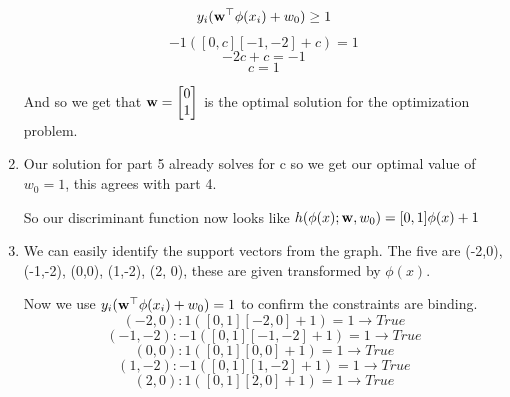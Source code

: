 \documentclass[submit]{harvardml}
\begin{document}
\begin{enumerate}
        \begin{equation*}
            y_i(\mathbf{w}^\top \mathbf{\phi}(x_i) + w_0) \geq 1
        \end{equation*}
        \begin{equation*}
            -1([0, c][-1, -2] + c) = 1
        \end{equation*}
        \begin{equation*}
            -2c + c = -1
        \end{equation*}
        \begin{equation*}
            c = 1
        \end{equation*}
        
        And so we get that $\mathbf{w} = \begin{bmatrix}
        0 \\
        1 \\
        \end{bmatrix}$ is the optimal solution for the optimization problem.
        
        \item Our solution for part 5 already solves for c so we get our optimal value of $w_0 = 1$, this agrees with part 4.
        
        So our discriminant function now looks like $h(\mathbf{\phi}(x);\mathbf{w},w_0) = [0, 1]\phi(x) + 1$
        
        \item We can easily identify the support vectors from the graph. The five are (-2,0), (-1,-2), (0,0), (1,-2), (2, 0), these are given transformed by $\phi(x)$.
        
        Now we use $y_i(\mathbf{w}^\top \mathbf{\phi}(x_i) + w_0) = 1$ to confirm the constraints are binding.
        \begin{equation*}
            (-2,0) : 1([0,1][-2,0] + 1) = 1 \longrightarrow True
        \end{equation*}
        \begin{equation*}
            (-1,-2) : -1([0,1][-1,-2] + 1) = 1 \longrightarrow True
        \end{equation*}
        \begin{equation*}
            (0,0) : 1([0,1][0,0] + 1) = 1 \longrightarrow True
        \end{equation*}
        \begin{equation*}
            (1,-2) : -1([0,1][1,-2] + 1) = 1 \longrightarrow True
        \end{equation*}
        \begin{equation*}
            (2, 0) : 1([0,1][2,0] + 1) = 1 \longrightarrow True
        \end{equation*}
\end{enumerate}
\end{document}
